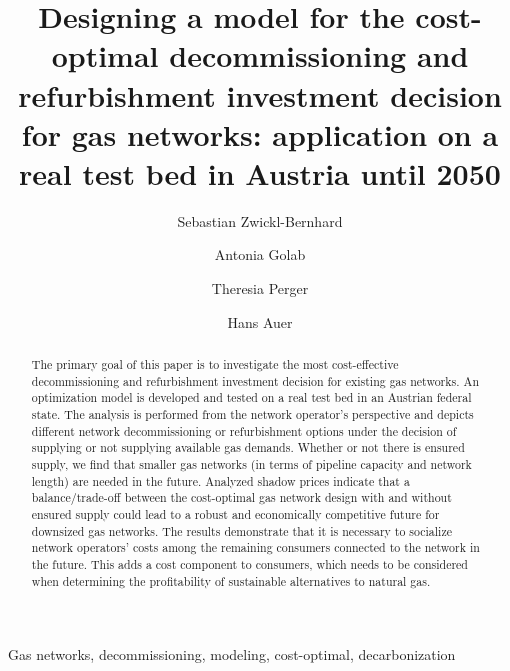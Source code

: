 \documentclass[review]{elsarticle}
\begin{document}
\begin{frontmatter}

\title{Designing a model for the cost-optimal decommissioning and refurbishment investment decision for gas networks: application on a real test bed in Austria until 2050}
\author[1,2]{Sebastian Zwickl-Bernhard}
\author[1]{Antonia Golab}
\author[1]{Theresia Perger}
\author[1,2]{Hans Auer}
\address[1]{Energy Economics Group (EEG), Technische Universität Wien, Gusshausstrasse 25-29/E370-3, 1040 Wien, Austria}
\address[2]{Industrial Economics and Technology Management, Norwegian University of Science and Technology, Gløshaugen, Alfred Getz vei 3, Trondheim, 7491, Norway}

\begin{abstract}
The primary goal of this paper is to investigate the most cost-effective decommissioning and refurbishment investment decision for existing gas networks. An optimization model is developed and tested on a real test bed in an Austrian federal state. The analysis is performed from the network operator's perspective and depicts different network decommissioning or refurbishment options under the decision of supplying or not supplying available gas demands. Whether or not there is ensured supply, we find that smaller gas networks (in terms of pipeline capacity and network length) are needed in the future. Analyzed shadow prices indicate that a balance/trade-off between the cost-optimal gas network design with and without ensured supply could lead to a robust and economically competitive future for downsized gas networks. The results demonstrate that it is necessary to socialize network operators' costs among the remaining consumers connected to the network in the future. This adds a cost component to consumers, which needs to be considered when determining the profitability of sustainable alternatives to natural gas.\\
\end{abstract}

\begin{keyword}
	Gas networks, decommissioning, modeling, cost-optimal, decarbonization
\end{keyword}
\end{frontmatter}

\newpage
\end{document}
